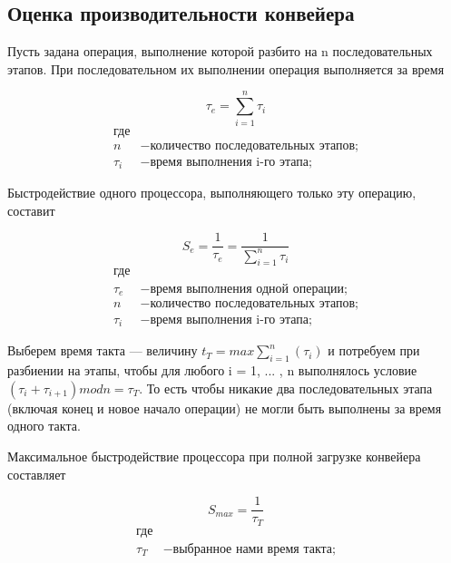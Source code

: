 \documentclass[12pt,a4paper]{article}
\numberwithin{equation}{section}
\begin{document}
\subsection{Оценка производительности конвейера}
\qquad Пусть задана операция, выполнение которой разбито на n последовательных этапов. При последовательном их выполнении операция выполняется за время

\begin{equation}\label{form:way}
 \tau _{e}={\sum\limits_{i=1}^n \tau _{i}}
 \end{equation}
 \begin{align*}
    \text{где} \\
    n &- \text{количество последовательных этапов;} \\
   \tau _{i} &- \text{время выполнения i-го этапа;}
\end{align*}

Быстродействие одного процессора, выполняющего только эту операцию, составит

\begin{equation}\label{form:way}
 S_{e}={\frac{1}{\tau _{e}}}={\frac{1}{\sum\limits_{i=1}^n \tau _{i}}}
 \end{equation}
 \begin{align*}
    \text{где} \\
    \tau _{e} &- \text{время выполнения одной операции;} \\
    n &- \text{количество последовательных этапов;} \\
   \tau _{i} &- \text{время выполнения i-го этапа;}
\end{align*}

Выберем время такта — величину $t _{T} = max{\sum\limits_{i=1}^n(\tau_{i})}$ и потребуем при разбиении на этапы, чтобы для любого i = 1, ... , n выполнялось условие $(\tau_{i} + \tau_{i+1}) mod n = \tau_{T}$. То есть чтобы никакие два последовательных этапа (включая конец и новое начало операции) не могли быть выполнены за время одного такта.

Максимальное быстродействие процессора при полной загрузке конвейера составляет

\begin{equation}\label{form:way}
 S_{max}={\frac{1}{\tau _{T}}}
 \end{equation}
 \begin{align*}
    \text{где} \\
    \tau _{T} &- \text{выбранное нами время такта;}
\end{align*}
\end{document}
